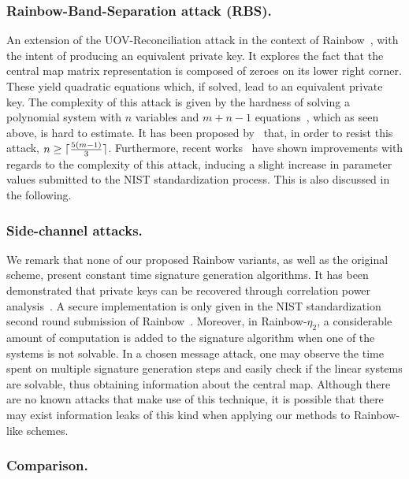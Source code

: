 \documentclass[12pt, a4paper, oneside]{memoir}
\DeclarePairedDelimiter{\ceil}{\lceil}{\rceil}
\theoremstyle{definition}
\begin{document}
\subsubsection{Rainbow-Band-Separation attack (RBS).}

An extension of the UOV-Reconciliation attack in the context of Rainbow~\cite{Ding:200806}, with the intent of producing an equivalent private key. It explores the fact that the central map matrix representation is composed of zeroes on its lower right corner. These yield quadratic equations which, if solved, lead to an equivalent private key. The complexity of this attack is given by the hardness of solving a polynomial system with $n$ variables and $m + n - 1$ equations~\cite[Thm.~3.30]{Thomae:201306}, which as seen above, is hard to estimate. It has been proposed by~\cite{Petzoldt:201005} that, in order to resist this attack, $n \geq \ceil{\frac{5 (m - 1)}{3}}$. Furthermore, recent works~\cite{Perlner:202006,Nakamura:202006} have shown improvements with regards to the complexity of this attack, inducing a slight increase in parameter values submitted to the NIST standardization process. This is also discussed in the following.

\subsubsection{Side-channel attacks.} 

We remark that none of our proposed Rainbow variants, as well as the original scheme, present constant time signature generation algorithms. It has been demonstrated that private keys can be recovered through correlation power analysis~\cite{Park:201808}. A secure implementation is only given in the NIST standardization second round submission of Rainbow~\cite{Ding:201901}. Moreover, in Rainbow-$\eta_2$, a considerable amount of computation is added to the signature algorithm when one of the systems is not solvable. In a chosen message attack, one may observe the time spent on multiple signature generation steps and easily check if the linear systems are solvable, thus obtaining information about the central map. Although there are no known attacks that make use of this technique, it is possible that there may exist information leaks of this kind when applying our methods to Rainbow-like schemes.

\subsubsection{Comparison.}
\end{document}
